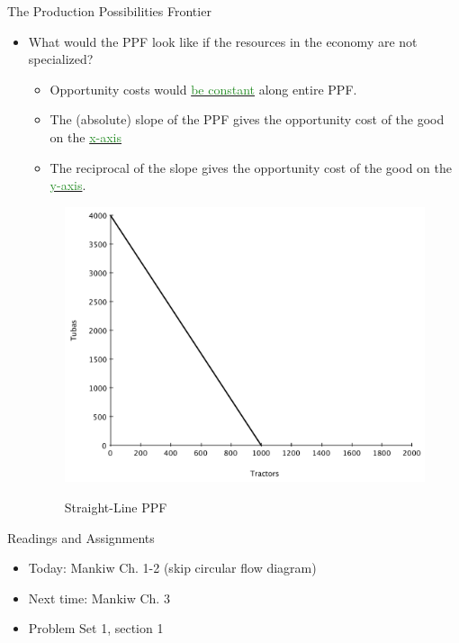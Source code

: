 \documentclass[xcolor={dvipsnames},pdf, hyperref={colorlinks=true, citecolor=ForestGreen, linkcolor=BlueViolet, urlcolor=Magenta}]{beamer}
\newcommand{\blank}[0]{}
\newcommand{\ddp}[1]{{\textcolor{ForestGreen}{#1}}}
\newcommand{\dd}[1]{{\underline{\textcolor{ForestGreen}{#1}}}}
\begin{document}
\begin{frame}{The Production Possibilities Frontier}
	\begin{itemize}
		\item What would the PPF look like if the resources in the economy are not specialized?
		\begin{itemize}
			\item Opportunity costs would \dd{be constant} along entire PPF.
			\item The (absolute) slope of the PPF gives the opportunity cost of the good on the \dd{x-axis}
			\item The reciprocal of the slope gives the opportunity cost of the good on the \dd{y-axis}.
	\end{itemize}
\blank\blank\blank\blank
	\begin{figure}[H]
		\centering
		\ddp{\includegraphics[scale=.2]{plot4.pdf}}
		\caption{Straight-Line PPF}
		\label{ppf4}
	\end{figure}
	\end{itemize}
\end{frame}

\begin{frame}{Readings and Assignments}
\begin{itemize}
		\item Today: Mankiw Ch. 1-2 (skip circular flow diagram)
		\item Next time: Mankiw Ch. 3
		\item Problem Set 1, section 1
\end{itemize}

\end{frame}
	
\end{document}
